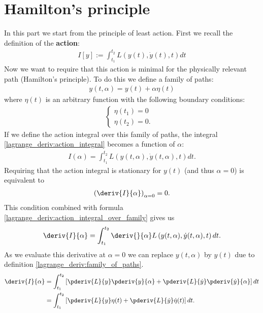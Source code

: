 \section{Hamilton's principle}
    In this part we start from the principle of least action. First we recall the definition of the \textbf{action}:
    \begin{gather}
        \label{lagrange_deriv:action_integral}
        I[y] := \int_{t_1}^{t_2}L\left(y(t), \dot{y}(t), t\right)dt
    \end{gather}
    Now we want to require that this action is minimal for the physically relevant path (Hamilton's principle). To do this we define a family of paths:
    \begin{gather}
        \label{lagrange_deriv:family_of_paths}
        y(t, \alpha) = y(t) + \alpha\eta(t)
    \end{gather}
    where $\eta(t)$ is an arbitrary function with the following boundary conditions:
    \begin{gather}
        \begin{cases}
        \eta(t_1) = 0&\\
        \eta(t_2) = 0.&
        \end{cases}
    \end{gather}
    If we define the action integral over this family of paths, the integral \ref{lagrange_deriv:action_integral} becomes a function of $\alpha$:
    \begin{gather}
        \label{lagrange_deriv:action_integral_over_family}
        I(\alpha) = \int_{t_1}^{t_2}L\left(y(t,\alpha), \dot{y}(t, \alpha), t\right)dt.
    \end{gather}
    Requiring that the action integral is stationary for $y(t)$ (and thus $\alpha = 0$) is equivalent to
    \begin{gather}
        \label{lagrange_deriv:stationary_condition}
        \left(\deriv{I}{\alpha}\right)_{\alpha=0} = 0.
    \end{gather}
    This condition combined with formula \ref{lagrange_deriv:action_integral_over_family} gives us
    \begin{gather}
        \label{lagrange_deriv:derivative_of_integral}
        \deriv{I}{\alpha} = \int_{t_1}^{t_2}\deriv{}{\alpha}L\left(y(t,\alpha), \dot{y}(t, \alpha), t\right)dt.
    \end{gather}
    As we evaluate this derivative at $\alpha = 0$ we can replace $y(t, \alpha)$ by $y(t)$ due to definition \ref{lagrange_deriv:family_of_paths}.
    \begin{align}
        \deriv{I}{\alpha}&=\int_{t_1}^{t_2}\left[\pderiv{L}{y}\pderiv{y}{\alpha} + \pderiv{L}{\dot{y}}\pderiv{\dot{y}}{\alpha}\right]dt\nonumber\\
        &=\int_{t_1}^{t_2}\left[\pderiv{L}{y}\eta(t) + \pderiv{L}{\dot{y}}\dot{\eta}(t)\right]dt.
    \end{align}
